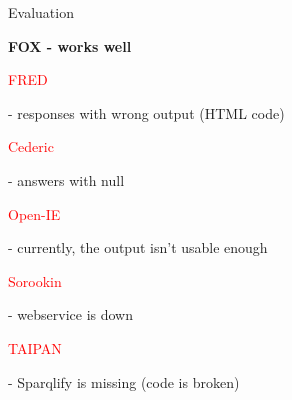 \begin{frame}{Evaluation}
	\begin{itemize}
		\item \textbf{FOX - works well}
		\textcolor{red}{\item FRED} - responses with wrong output (HTML code)
			\textcolor{red}{\item Cederic} - answers with null
			\textcolor{red}{\item Open-IE} - currently, the output isn't usable enough
			\textcolor{red}{\item Sorookin} - webservice is down
			\textcolor{red}{\item TAIPAN} - Sparqlify is missing (code is broken)
		
	\end{itemize}

\end{frame}